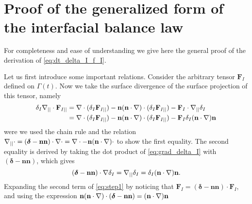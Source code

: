 \section{Proof of the generalized form of the interfacial balance law}

For completeness and ease of understanding we give here the general proof of the derivation of \ref{eq:dt_delta_I_f_I}. 

Let us first introduce some important relations. 
Consider the arbitrary tensor $ \textbf{F}_{I}$ defined on $\Gamma(t)$.
Now we take the surface divergence of the surface projection of this tensor, namely
\begin{align}
    \delta_I \mathbf{\nabla}_{||}\cdot \textbf{F}_{I||}
    &= 
    \mathbf{\nabla}\cdot (\delta_I \textbf{F}_{I||})
    - \textbf{n}(\textbf{n}\cdot\mathbf{\nabla})\cdot (\delta_I \textbf{F}_{I||})
    - \textbf{F}_{I}\cdot\mathbf{\nabla}_{||}\delta_I \nonumber\\
    &= 
    \mathbf{\nabla}\cdot (\delta_I \textbf{F}_{I||})
    - \textbf{n}(\textbf{n}\cdot\mathbf{\nabla})\cdot (\delta_I \textbf{F}_{I||})
    - \textbf{F}_{I} \delta_I (\textbf{n}\cdot\mathbf{\nabla})\textbf{n}
    \label{eq:step1}
\end{align}
were we used the chain rule and the relation $\mathbf{\nabla}_{||}\cdot = (\bm\delta - \textbf{nn})\cdot \mathbf{\nabla}\cdot = \mathbf{\nabla}\cdot - \textbf{n}(\textbf{n}\cdot \mathbf{\nabla})\cdot$ to show the first equality. 
The second equality is derived by taking the dot product of \ref{eq:grad_delta_I} with $(\bm\delta -\textbf{nn})$, which gives 
\begin{equation*}
    (\bm\delta - \textbf{nn}) \cdot \mathbf{\nabla}\delta_I
    = \mathbf{\nabla}_{||} \delta_I
    = 
    \delta_I (\textbf{n}\cdot \mathbf{\nabla})\textbf{n}.
\end{equation*}
Expanding the second term of \ref{eq:step1} by noticing that $\textbf{F}_{I} = (\bm\delta - \textbf{nn})\cdot \textbf{F}_I$, and using the expression $\textbf{n}(\textbf{n}\cdot\mathbf{\nabla})\cdot (\bm\delta - \textbf{nn}) =  (\textbf{n}\cdot\mathbf{\nabla})\textbf{n}$
